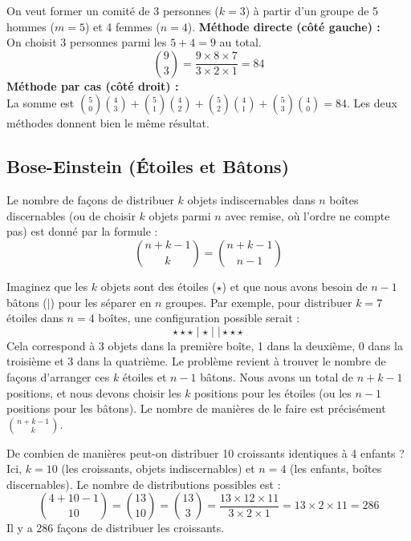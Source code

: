 \begin{examplebox}
On veut former un comité de 3 personnes ($k=3$) à partir d'un groupe de 5 hommes ($m=5$) et 4 femmes ($n=4$).
\vspace{0.3cm}
\noindent\textbf{Méthode directe (côté gauche) :} \\
On choisit 3 personnes parmi les $5+4=9$ au total.
$$ \binom{9}{3} = \frac{9 \times 8 \times 7}{3 \times 2 \times 1} = 84 $$
\vspace{0.3cm}
\noindent\textbf{Méthode par cas (côté droit) :} \\
La somme est $\binom{5}{0}\binom{4}{3} + \binom{5}{1}\binom{4}{2} + \binom{5}{2}\binom{4}{1} + \binom{5}{3}\binom{4}{0} = 84$. Les deux méthodes donnent bien le même résultat.
\end{examplebox}

\subsection{Bose-Einstein (Étoiles et Bâtons)}

\begin{theorembox}
Le nombre de façons de distribuer $k$ objets indiscernables dans $n$ boîtes discernables (ou de choisir $k$ objets parmi $n$ avec remise, où l'ordre ne compte pas) est donné par la formule :
$$ \binom{n+k-1}{k} = \binom{n+k-1}{n-1} $$
\end{theorembox}

\begin{intuitionbox}
Imaginez que les $k$ objets sont des étoiles ($\star$) et que nous avons besoin de $n-1$ bâtons ($|$) pour les séparer en $n$ groupes. Par exemple, pour distribuer $k=7$ étoiles dans $n=4$ boîtes, une configuration possible serait :
$$ \star\star\star \mid \star \mid \mid \star\star\star $$
Cela correspond à 3 objets dans la première boîte, 1 dans la deuxième, 0 dans la troisième et 3 dans la quatrième.
Le problème revient à trouver le nombre de façons d'arranger ces $k$ étoiles et $n-1$ bâtons. Nous avons un total de $n+k-1$ positions, et nous devons choisir les $k$ positions pour les étoiles (ou les $n-1$ positions pour les bâtons). Le nombre de manières de le faire est précisément $\binom{n+k-1}{k}$.
\end{intuitionbox}

\begin{examplebox}
De combien de manières peut-on distribuer 10 croissants identiques à 4 enfants ?
\newline
Ici, $k=10$ (les croissants, objets indiscernables) et $n=4$ (les enfants, boîtes discernables).
Le nombre de distributions possibles est :
$$ \binom{4+10-1}{10} = \binom{13}{10} = \binom{13}{3} = \frac{13 \times 12 \times 11}{3 \times 2 \times 1} = 13 \times 2 \times 11 = 286 $$
Il y a 286 façons de distribuer les croissants.
\end{examplebox}

